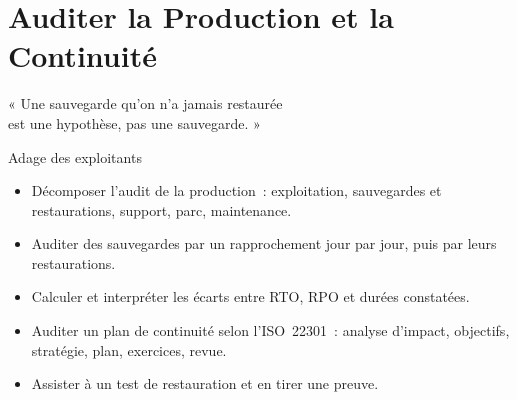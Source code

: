 
\chapter{Auditer la Production et la Continuité}
\label{chap:audit-continuite}

\epigraph{%
    « Une sauvegarde qu'on n'a jamais restaurée\\
    est une hypothèse, pas une sauvegarde. »%
}{Adage des exploitants}


\begin{boxobjectifs}
\begin{itemize}
    \item Décomposer l'audit de la production~: exploitation, sauvegardes et
          restaurations, support, parc, maintenance.
    \item Auditer des sauvegardes par un rapprochement jour par jour, puis
          par leurs restaurations.
    \item Calculer et interpréter les écarts entre RTO, RPO et durées
          constatées.
    \item Auditer un plan de continuité selon l'ISO~22301~: analyse
          d'impact, objectifs, stratégie, plan, exercices, revue.
    \item Assister à un test de restauration et en tirer une preuve.
\end{itemize}
\end{boxobjectifs}

